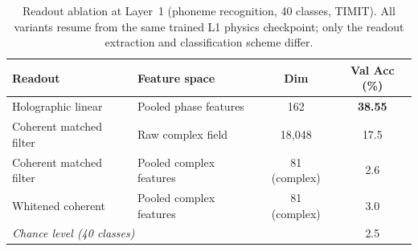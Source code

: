 \begin{table}[ht]
\centering
\caption{Readout ablation at Layer~1 (phoneme recognition, 40 classes, TIMIT).
All variants resume from the same trained L1 physics checkpoint; only the
readout extraction and classification scheme differ.}
\label{tab:readout_ablation}
\begin{tabular}{llcc}
\toprule
\textbf{Readout} & \textbf{Feature space} & \textbf{Dim} & \textbf{Val Acc (\%)} \\
\midrule
Holographic linear       & Pooled phase features          & 162   & \textbf{38.55} \\
Coherent matched filter  & Raw complex field              & 18,048 & 17.5 \\
Coherent matched filter  & Pooled complex features        & 81 (complex) & 2.6 \\
Whitened coherent        & Pooled complex features        & 81 (complex) & 3.0 \\
\midrule
\multicolumn{3}{l}{\textit{Chance level (40 classes)}} & 2.5 \\
\bottomrule
\end{tabular}
\end{table}

